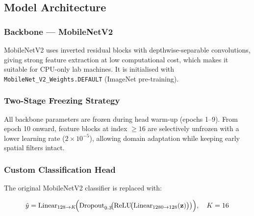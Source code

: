 \documentclass[12pt,a4paper]{article}
\begin{document}
\subsection{Model Architecture}

\subsubsection{Backbone — MobileNetV2}
MobileNetV2 uses inverted residual blocks with depthwise-separable convolutions,
giving strong feature extraction at low computational cost, which makes it suitable
for CPU-only lab machines. It is initialised with
\texttt{MobileNet\_V2\_Weights.DEFAULT} (ImageNet pre-training).

\subsubsection{Two-Stage Freezing Strategy}
All backbone parameters are frozen during head warm-up (epochs 1--9). From epoch 10
onward, feature blocks at index $\geq 16$ are selectively unfrozen with a lower
learning rate ($2\times10^{-5}$), allowing domain adaptation while keeping early
spatial filters intact.

\subsubsection{Custom Classification Head}
The original MobileNetV2 classifier is replaced with:

\begin{equation}
  \hat{y} = \text{Linear}_{128 \to K}\!\Bigl(
    \text{Dropout}_{0.3}\!\bigl(
      \text{ReLU}\!\bigl(
        \text{Linear}_{1280 \to 128}(\mathbf{z})
      \bigr)
    \bigr)
  \Bigr), \quad K = 16
\end{equation}
\end{document}
